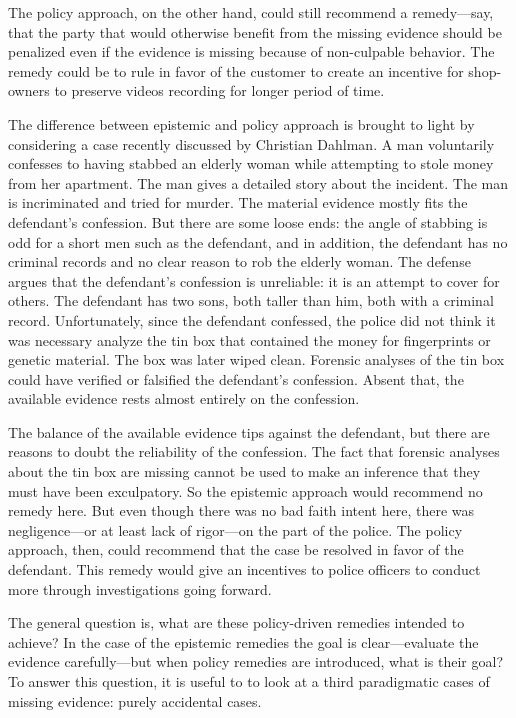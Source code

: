\documentclass[
  10pt,
  dvipsnames,enabledeprecatedfontcommands]{scrartcl}
\begin{document}
The policy approach, on the other hand, could still recommend a
remedy---say, that the party that would otherwise benefit from the
missing evidence should be penalized even if the evidence is missing
because of non-culpable behavior. The remedy could be to rule in favor
of the customer to create an incentive for shop-owners to preserve
videos recording for longer period of time.

The difference between epistemic and policy approach is brought to light
by considering a case recently discussed by Christian Dahlman. A man
voluntarily confesses to having stabbed an elderly woman while
attempting to stole money from her apartment. The man gives a detailed
story about the incident. The man is incriminated and tried for murder.
The material evidence mostly fits the defendant's confession. But there
are some loose ends: the angle of stabbing is odd for a short men such
as the defendant, and in addition, the defendant has no criminal records
and no clear reason to rob the elderly woman. The defense argues that
the defendant's confession is unreliable: it is an attempt to cover for
others. The defendant has two sons, both taller than him, both with a
criminal record. Unfortunately, since the defendant confessed, the
police did not think it was necessary analyze the tin box that contained
the money for fingerprints or genetic material. The box was later wiped
clean. Forensic analyses of the tin box could have verified or falsified
the defendant's confession. Absent that, the available evidence rests
almost entirely on the confession.

The balance of the available evidence tips against the defendant, but
there are reasons to doubt the reliability of the confession. The fact
that forensic analyses about the tin box are missing cannot be used to
make an inference that they must have been exculpatory. So the epistemic
approach would recommend no remedy here. But even though there was no
bad faith intent here, there was negligence---or at least lack of
rigor---on the part of the police. The policy approach, then, could
recommend that the case be resolved in favor of the defendant. This
remedy would give an incentives to police officers to conduct more
through investigations going forward.

The general question is, what are these policy-driven remedies intended
to achieve? In the case of the epistemic remedies the goal is
clear---evaluate the evidence carefully---but when policy remedies are
introduced, what is their goal? To answer this question, it is useful to
to look at a third paradigmatic cases of missing evidence: purely
accidental cases.
\end{document}
